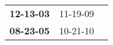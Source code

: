 \begin{supertabular}{p{0.33\columnwidth}p{0.33\columnwidth}p{0.33\columnwidth}}
 \textbf{12-13-03\textsuperscript{}} &  11-19-09\textsuperscript{} \\
 \textbf{08-23-05\textsuperscript{}} &  10-21-10\textsuperscript{} \\
\end{supertabular}
